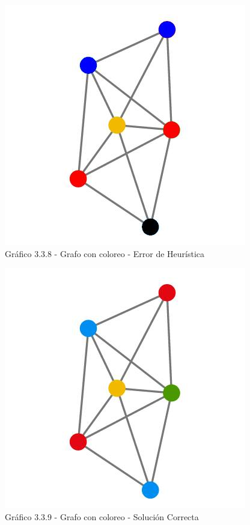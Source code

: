 \vspace*{0.3cm} \vspace*{0.3cm}
  \begin{center}
 \includegraphics[scale=0.5]{./ej3/parte3/grafo3color.jpg}
 	{\\Gráfico 3.3.8 - Grafo con coloreo - Error de Heurística}
  \end{center}
  \vspace*{0.3cm}
  
  \vspace*{0.3cm} \vspace*{0.3cm}
  \begin{center}
 \includegraphics[scale=0.5]{./ej3/parte3/grafo3color2.jpg}
 	{\\Gráfico 3.3.9 - Grafo con coloreo - Solución Correcta}
  \end{center}
  \vspace*{0.3cm}
  